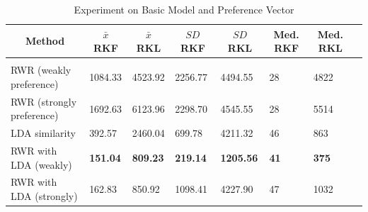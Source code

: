 \documentclass{article} %
\begin{document}
\begin{table}[t]
\caption{Experiment on Basic Model and Preference Vector}
\label{results-table}
\begin{center}
\begin{tabular}{llllllll}
\multicolumn{1}{c}{\bf Method}  &\multicolumn{1}{c}{\bf $\bar x$ RKF} &\multicolumn{1}{c}{\bf $\bar x$ RKL} &\multicolumn{1}{c}{\bf $SD$ RKF} &\multicolumn{1}{c}{\bf $SD$ RKL} &\multicolumn{1}{c}{\bf Med. RKF} &\multicolumn{1}{c}{\bf Med. RKL}
\\ \hline \\
 {RWR (weakly  preference)} & 1084.33 & 4523.92 & 2256.77 & 4494.55 & 28 & 4822\\
 {RWR (strongly  preference)}& 1692.63 & 6123.96 & 2298.70 & 4545.55 & 28 & 5514\\
{LDA similarity}  & 392.57 & 2460.04 & 699.78 & 4211.32 & 46 & 863\\
{RWR with LDA}  (weakly) &\textbf{151.04} &\textbf{809.23} & \textbf{219.14} & \textbf{1205.56} & \textbf{41} & \textbf{375}\\
{RWR with LDA}  (strongly) & 162.83 & 850.92 & 1098.41 & 4227.90 & 47 & 1032\\
\end{tabular}
\end{center}
\end{table}
\end{document}
